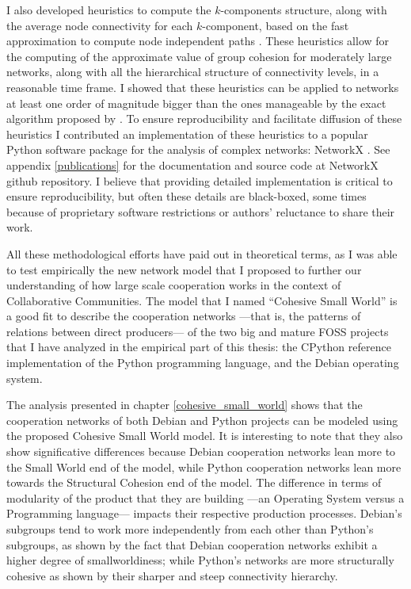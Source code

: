 I also developed heuristics to compute the $k$-components structure, along with the average node connectivity for each $k$-component, based on the fast approximation to compute node independent paths \citep{white:2001b}. These heuristics allow for the computing of the approximate value of group cohesion for moderately large networks, along with all the hierarchical structure of connectivity levels, in a reasonable time frame. I showed that these heuristics can be applied to networks at least one order of magnitude bigger than the ones manageable by the exact algorithm proposed by \citet{moody:2003}. To ensure reproducibility and facilitate diffusion of these heuristics I contributed an implementation of these heuristics to a popular Python software package for the analysis of complex networks: NetworkX \citep{hagberg:2008}. See appendix \ref{publications} for the documentation and source code at NetworkX github repository. I believe that providing detailed implementation is critical to ensure reproducibility, but often these details are black-boxed, some times because of proprietary software restrictions or authors' reluctance to share their work.

All these methodological efforts have paid out in theoretical terms, as I was able to test empirically the new network model that I proposed to further our understanding of how large scale cooperation works in the context of Collaborative Communities. The model that I named ``Cohesive Small World'' is a good fit to describe the cooperation networks ---that is, the patterns of relations between direct producers--- of the two big and mature FOSS projects that I have analyzed in the empirical part of this thesis: the CPython reference implementation of the Python programming language, and the Debian operating system.

The analysis presented in chapter \ref{cohesive_small_world} shows that the cooperation networks of both Debian and Python projects can be modeled using the proposed Cohesive Small World model. It is interesting to note that they also show significative differences because Debian cooperation networks lean more to the Small World end of the model, while Python cooperation networks lean more towards the Structural Cohesion end of the model. The difference in terms of modularity of the product that they are building ---an Operating System versus a Programming language--- impacts their respective production processes. Debian's subgroups tend to work more independently from each other than Python's subgroups, as shown by the fact that Debian cooperation networks exhibit a higher degree of smallworldiness; while Python's networks are more structurally cohesive as shown by their sharper and steep connectivity hierarchy.


